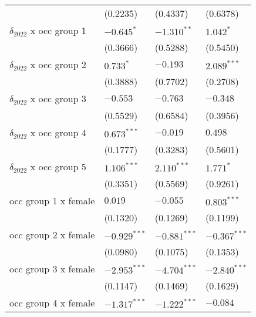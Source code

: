 \begin{tabular}{llll}
                                       &           (0.2235) &           (0.4337) &           (0.6378) \\
$\delta_{2022}$ x occ group 1          &         $-0.645^*$ &      $-1.310^{**}$ &          $1.042^*$ \\
                                       &           (0.3666) &           (0.5288) &           (0.5450) \\
$\delta_{2022}$ x occ group 2          &          $0.733^*$ &           $-0.193$ &      $2.089^{***}$ \\
                                       &           (0.3888) &           (0.7702) &           (0.2708) \\
$\delta_{2022}$ x occ group 3          &           $-0.553$ &           $-0.763$ &           $-0.348$ \\
                                       &           (0.5529) &           (0.6584) &           (0.3956) \\
$\delta_{2022}$ x occ group 4          &      $0.673^{***}$ &           $-0.019$ &            $0.498$ \\
                                       &           (0.1777) &           (0.3283) &           (0.5601) \\
$\delta_{2022}$ x occ group 5          &      $1.106^{***}$ &      $2.110^{***}$ &          $1.771^*$ \\
                                       &           (0.3351) &           (0.5569) &           (0.9261) \\
occ group 1 x female                   &            $0.019$ &           $-0.055$ &      $0.803^{***}$ \\
                                       &           (0.1320) &           (0.1269) &           (0.1199) \\
occ group 2 x female                   &     $-0.929^{***}$ &     $-0.881^{***}$ &     $-0.367^{***}$ \\
                                       &           (0.0980) &           (0.1075) &           (0.1353) \\
occ group 3 x female                   &     $-2.953^{***}$ &     $-4.704^{***}$ &     $-2.840^{***}$ \\
                                       &           (0.1147) &           (0.1469) &           (0.1629) \\
occ group 4 x female                   &     $-1.317^{***}$ &     $-1.222^{***}$ &           $-0.084$ \\

\end{tabular}

